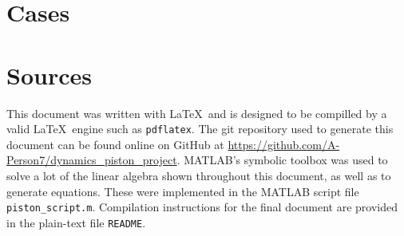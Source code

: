 \documentclass[nofoot,pdf-a,balance,colorlinks,upint,subscriptcorrection,varvw,mathalfa=cal=boondoxo]{asmeconf}
\begin{document}
    \appendix
    \section{Cases}\label{appendix:cases}


    

    \section{Sources}\label{appendix:sources} 

    This document was written with \LaTeX\ and is designed to be compilled by a valid \LaTeX\ engine such as \texttt{pdflatex}. The git repository used to generate this document can be found online on GitHub at \href{https://github.com/A-Person7/dynamics_piston_project}{https://github.com/A-Person7/dynamics_piston_project}. MATLAB's symbolic toolbox was used to solve a lot of the linear algebra shown throughout this document, as well as to generate equations. These were implemented in the MATLAB script file \texttt{piston_script.m}. Compilation instructions for the final document are provided in the plain-text file \texttt{README}.

    
\end{document}
